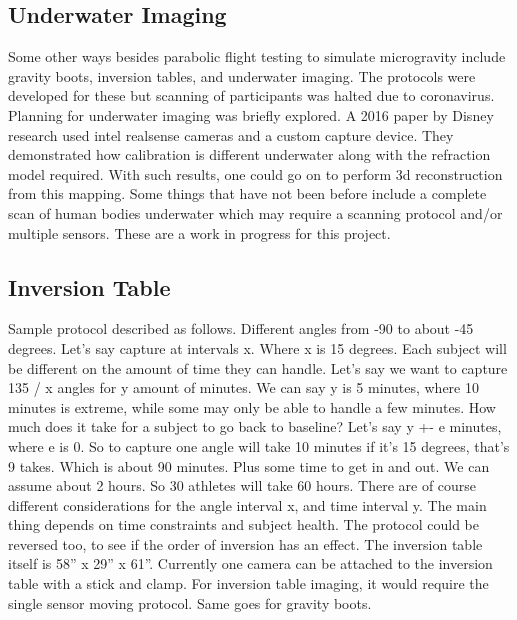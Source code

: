 \subsection{Underwater Imaging}
Some other ways besides parabolic flight testing to simulate microgravity include gravity boots, inversion tables, and underwater imaging. The protocols were developed for these but scanning of participants was halted due to coronavirus. Planning for underwater imaging was briefly explored. A 2016 paper by Disney research \cite{digumarti2016underwater} used intel realsense cameras and a custom capture device. They demonstrated how calibration is different underwater along with the refraction model required. With such results, one could go on to perform 3d reconstruction from this mapping. Some things that have not been before include a complete scan of human bodies underwater which may require a scanning protocol and/or multiple sensors. These are a work in progress for this project.
\subsection{Inversion Table}
Sample protocol described as follows. Different angles from -90 to about -45 degrees. Let’s say capture at intervals x. Where x is 15 degrees. Each subject will be different on the amount of time they can handle. Let’s say we want to capture 135 / x angles for y amount of minutes. We can say y is 5 minutes, where 10 minutes is extreme, while some may only be able to handle a few minutes. How much does it take for a subject to go back to baseline? Let’s say y +- e minutes, where e is 0. So to capture one angle will take 10 minutes if it’s 15 degrees, that’s 9 takes. Which is about 90 minutes. Plus some time to get in and out. We can assume about 2 hours. So 30 athletes will take 60 hours. There are of course different considerations for the angle interval x, and time interval y. The main thing depends on time constraints and subject health. The protocol could be reversed too, to see if the order of inversion has an effect. The inversion table itself is 58” x 29” x 61”. Currently one camera can be attached to the inversion table with a stick and clamp. For inversion table imaging, it would require the single sensor moving protocol. Same goes for gravity boots. 

